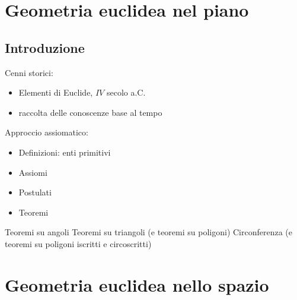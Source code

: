 
\part{Geometria euclidea nel piano}
\chapter{Introduzione}
Cenni storici:
\begin{itemize}
    \item Elementi di Euclide, $IV$ secolo a.C.
    \item raccolta delle conoscenze base al tempo
\end{itemize}
Approccio assiomatico:
\begin{itemize}
    \item Definizioni: enti primitivi
    \item Assiomi
    \item Postulati
    \item Teoremi
\end{itemize}

Teoremi su angoli
Teoremi su triangoli (e teoremi su poligoni)
Circonferenza (e teoremi su poligoni iscritti e circoscritti)

\part{Geometria euclidea nello spazio}
